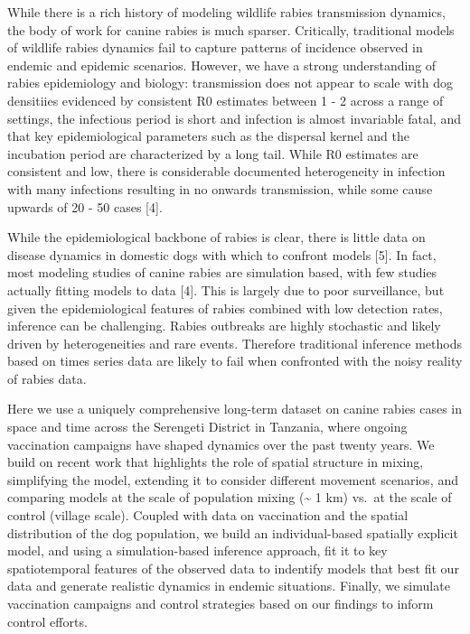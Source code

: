 \documentclass[
]{book}
\begin{document}
While there is a rich history of modeling wildlife rabies transmission dynamics, the body of work for canine rabies is much sparser. Critically, traditional models of wildlife rabies dynamics fail to capture patterns of incidence observed in endemic and epidemic scenarios. However, we have a strong understanding of rabies epidemiology and biology: transmission does not appear to scale with dog densitiies evidenced by consistent R0 estimates between 1 - 2 across a range of settings, the infectious period is short and infection is almost invariable fatal, and that key epidemiological parameters such as the dispersal kernel and the incubation period are characterized by a long tail. While R0 estimates are consistent and low, there is considerable documented heterogeneity in infection with many infections resulting in no onwards transmission, while some cause upwards of 20 - 50 cases {[}4{]}.

While the epidemiological backbone of rabies is clear, there is little data on disease dynamics in domestic dogs with which to confront models {[}5{]}. In fact, most modeling studies of canine rabies are simulation based, with few studies actually fitting models to data {[}4{]}. This is largely due to poor surveillance, but given the epidemiological features of rabies combined with low detection rates, inference can be challenging. Rabies outbreaks are highly stochastic and likely driven by heterogeneities and rare events. Therefore traditional inference methods based on times series data are likely to fail when confronted with the noisy reality of rabies data.

Here we use a uniquely comprehensive long-term dataset on canine rabies cases in space and time across the Serengeti District in Tanzania, where ongoing vaccination campaigns have shaped dynamics over the past twenty years. We build on recent work that highlights the role of spatial structure in mixing, simplifying the model, extending it to consider different movement scenarios, and comparing models at the scale of population mixing (\textasciitilde{} 1 km) vs.~at the scale of control (village scale). Coupled with data on vaccination and the spatial distribution of the dog population, we build an individual-based spatially explicit model, and using a simulation-based inference approach, fit it to key spatiotemporal features of the observed data to indentify models that best fit our data and generate realistic dynamics in endemic situations. Finally, we simulate vaccination campaigns and control strategies based on our findings to inform control efforts.
\end{document}
